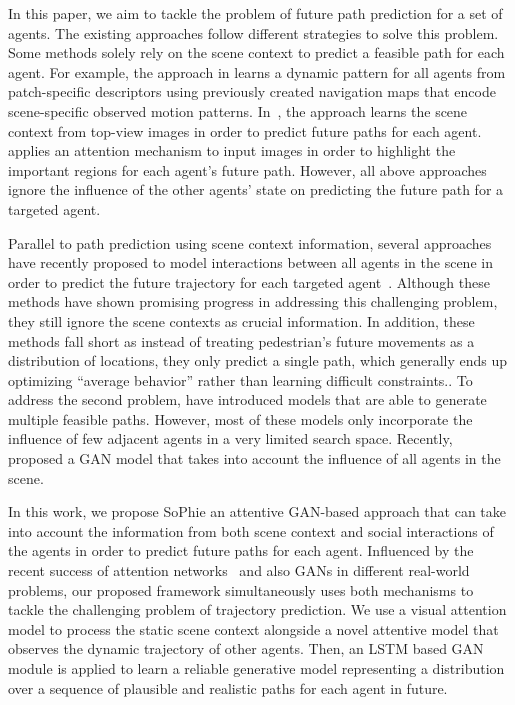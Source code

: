 \documentclass[10pt,twocolumn,letterpaper]{article}
\begin{document}
In this paper, we aim to tackle the problem of future path prediction for a set of agents. The existing approaches follow different strategies to solve this problem. Some methods solely rely on the scene context to predict a feasible path for each agent. For example, the approach in \cite{ballan2016knowledge} learns a dynamic pattern for all agents from patch-specific descriptors using previously created navigation maps that encode scene-specific observed motion patterns.
In~\cite{lee2017desire}, the approach learns the scene context from top-view images in order to predict future paths for each agent.  ~\cite{sadeghian2017car} applies an attention mechanism to input images in order to highlight the important regions for each agent's future path. However, all above approaches ignore the influence of the other agents' state on predicting the future path for a targeted agent. 


Parallel to path prediction using scene context information, several approaches have recently proposed to model interactions between all agents in the scene in order to predict the future trajectory for each targeted agent~\cite{fernando2017tree,fernando2017soft+}. 
Although these methods have shown promising progress in addressing this challenging problem, they still ignore the scene contexts as crucial information. In addition, these methods fall short as instead of treating pedestrian's future movements as a distribution of locations, they only predict a single path, which generally ends up optimizing ``average behavior'' rather than learning difficult constraints.. To address the second problem, \cite{alahi2016social,lee2017desire,xue2018ss} have introduced models that are able to generate multiple feasible paths. However, most of these models only incorporate the influence of few adjacent agents in a very limited search space. Recently, ~\cite{gupta2018social} proposed a GAN model that takes into account the influence of all agents in the scene.


In this work, we propose SoPhie an attentive GAN-based approach that can take into account the information from both scene context and social interactions of the agents in order to predict future paths for each agent. Influenced by the recent success of attention networks~\cite{xu2015show} and also GANs \cite{goodfellow2014generative} in different real-world problems, our proposed framework simultaneously uses both mechanisms to tackle the challenging problem of trajectory prediction. We use a visual attention model to process the static scene context alongside a novel attentive model that observes the dynamic trajectory of other agents. Then, an LSTM based GAN module is applied to learn a reliable generative model representing a distribution over a sequence of plausible and realistic paths for each agent in future.
\end{document}
